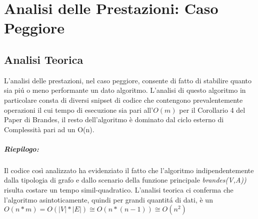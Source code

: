 \chapter{Analisi delle Prestazioni: Caso Peggiore}%
\section{Analisi Teorica}
L'analisi delle prestazioni, nel caso peggiore, consente di fatto di stabilire quanto sia pi\'u o meno performante un dato algoritmo. L'analisi di questo algoritmo in particolare consta di diversi snipset di codice che contengono prevalentemente operazioni il cui tempo di esecuzione sia pari all'$O(m)$ per il Corollario 4 del Paper di Brandes, il resto dell'algoritmo è dominato dal ciclo esterno di Complessità pari ad un O(n).
\newline
\newline


\newline 
\newpage 




\paragraph{Riepilogo:}
	Il codice così analizzato ha evidenziato il fatto che l'algoritmo indipendentemente dalla tipologia di grafo e dallo scenario della funzione principale \emph{brandes(V,A))} risulta costare un tempo simil-quadratico. L'analisi teorica ci conferma che l'algoritmo asintoticamente, quindi per grandi quantit\'a di dati, è un $O(n*m) = O(|V|*|E|) \cong O(n*(n-1)) \cong O(n^2)$

